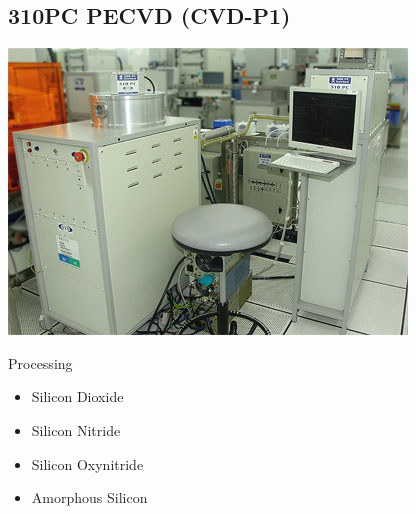 \subsection{310PC PECVD (CVD-P1)}\label{chemical_vapor_deposition_machine}
\WaferSemiClean

\begin{minipage}[H]{\MachinePictureWidth}
	\includegraphics[width=\MachinePictureWidth]{pictures_machines/thermal_pecvd1.png}
\end{minipage}\begin{minipage}[H]{0.5\textwidth}
Processing
\begin{itemize}
	\item Silicon Dioxide
	\item Silicon Nitride
	\item Silicon Oxynitride
	\item Amorphous Silicon
\end{itemize}
\end{minipage}

